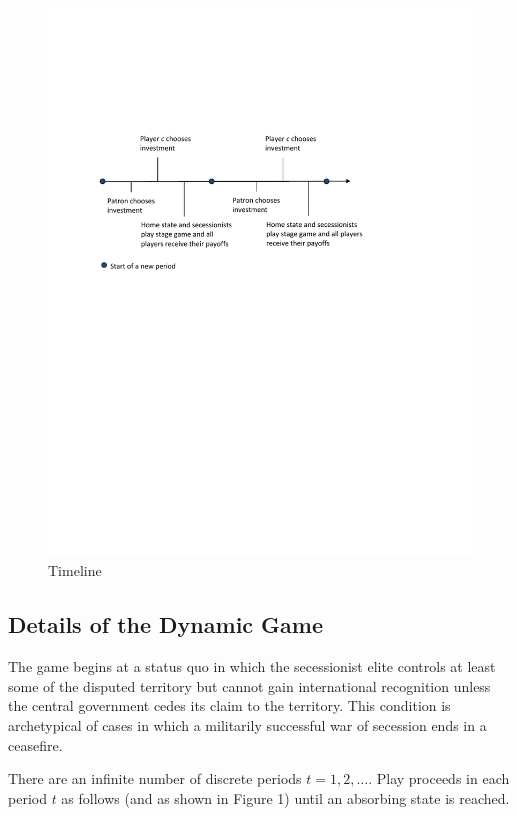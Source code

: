 \begin{figure}
\includegraphics{Timeline2.pdf}
\caption{Timeline}
\end{figure}

\subsection{Details of the Dynamic Game}
\label{sec:structure}

The game begins at a status quo in which the secessionist elite controls at least some of the disputed territory but cannot gain international recognition unless the central government cedes its claim to the territory. This condition is archetypical of cases in which a militarily successful war of secession ends in a ceasefire.  

There are an infinite number of discrete periods $t=1,2,\ldots$. Play proceeds in each period $t$ as follows (and as shown in Figure 1) until an absorbing state is reached.


